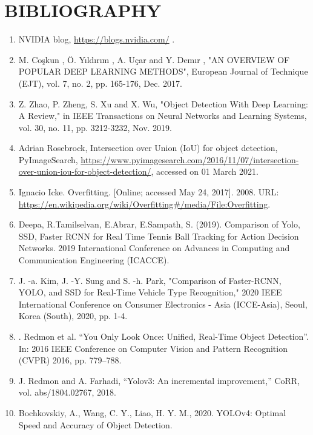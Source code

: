 \chapter{BIBLIOGRAPHY}

\renewcommand{\headrulewidth}{0.5pt}
\renewcommand{\footrulewidth}{0.5pt}
\thispagestyle{plain}
\pagestyle{fancy}
\fancyhf{}
\raggedright
{}

\begin{enumerate}
    \item NVIDIA blog, \url{https://blogs.nvidia.com/} .
    \item M. Coşkun , Ö. Yıldırım , A. Uçar and Y. Demır , "AN OVERVIEW OF POPULAR DEEP LEARNING METHODS", European Journal of Technique (EJT), vol. 7, no. 2, pp. 165-176, Dec. 2017.
    \item Z. Zhao, P. Zheng, S. Xu and X. Wu, "Object Detection With Deep Learning: A Review," in IEEE Transactions on Neural Networks and Learning Systems, vol. 30, no. 11, pp. 3212-3232, Nov. 2019.
    \item Adrian Rosebrock, Intersection over Union (IoU) for object detection, PyImageSearch, \url{https://www.pyimagesearch.com/2016/11/07/intersection-over-union-iou-for-object-detection/}, accessed on 01 March 2021.
    \item Ignacio Icke. Overfitting. [Online; accessed May 24, 2017]. 2008. URL: \url{https://en.wikipedia.org/wiki/Overfitting#/media/File:Overfitting}.
    \item Deepa, R.Tamilselvan, E.Abrar, E.Sampath, S. (2019). Comparison of Yolo, SSD, Faster RCNN for Real Time Tennis Ball Tracking for Action Decision Networks. 2019 International Conference on Advances in Computing and Communication Engineering (ICACCE).
    \item J. -a. Kim, J. -Y. Sung and S. -h. Park, "Comparison of Faster-RCNN, YOLO, and SSD for Real-Time Vehicle Type Recognition," 2020 IEEE International Conference on Consumer Electronics - Asia (ICCE-Asia), Seoul, Korea (South), 2020, pp. 1-4.
    \item . Redmon et al. “You Only Look Once: Unified, Real-Time Object Detection”. In: 2016 IEEE Conference on Computer Vision and Pattern Recognition (CVPR) 2016, pp. 779–788.
    \item J. Redmon and A. Farhadi, “Yolov3: An incremental improvement,” CoRR, vol. abs/1804.02767, 2018.
    \item Bochkovskiy, A., Wang, C. Y., Liao, H. Y. M., 2020. YOLOv4: Optimal Speed and Accuracy of Object Detection.

\end{enumerate}
